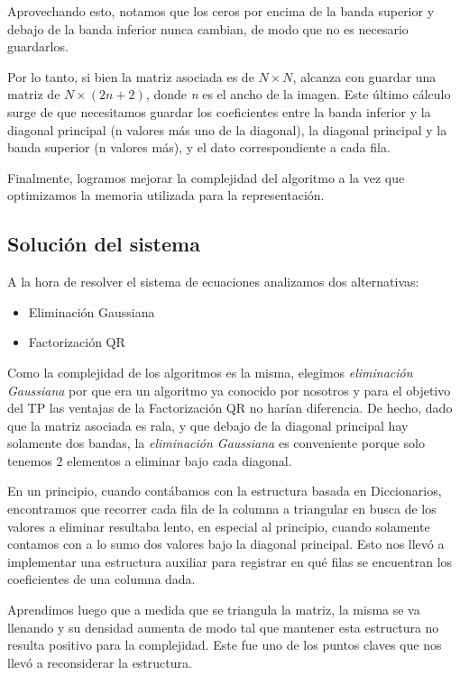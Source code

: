\documentclass[a4paper]{article}
\begin{document}
Aprovechando esto, notamos que los ceros por encima de la banda superior y debajo de la banda inferior nunca cambian, de modo que no es necesario guardarlos. \vspace{1em}

Por lo tanto, si bien la matriz asociada es de $N \times N$, alcanza con guardar una matriz de $N \times (2n + 2)$, donde \textit{n} es el ancho de la imagen. Este último cálculo surge de que necesitamos guardar los coeficientes entre la banda inferior y la diagonal principal (n valores más uno de la diagonal), la diagonal principal y la banda superior (n valores más), y el dato correspondiente a cada fila.

Finalmente, logramos mejorar la complejidad del algoritmo a la vez que optimizamos la memoria utilizada para la representación.

\subsection{Solución del sistema}

A la hora de resolver el sistema de ecuaciones analizamos dos alternativas:
\begin{itemize}
	\item Eliminación Gaussiana
	\item Factorización QR
\end{itemize}

\vspace{2em}
Como la complejidad de los algoritmos es la misma, elegimos \textit{eliminación Gaussiana} por que era un algoritmo ya conocido por nosotros y para el objetivo del TP las ventajas de la Factorización QR no harían diferencia. 
De hecho, dado que la matriz asociada es rala, y que debajo de la diagonal principal hay solamente dos bandas, la \textit{eliminación Gaussiana} es conveniente porque solo tenemos 2 elementos a eliminar bajo cada diagonal.


En un principio, cuando contábamos con la estructura basada en Diccionarios, encontramos que recorrer cada fila de la columna a triangular en busca de los valores a eliminar resultaba lento, en especial al principio, cuando solamente contamos con a lo sumo dos valores bajo la diagonal principal. Esto nos llevó a implementar una estructura auxiliar para registrar en qué filas se encuentran los coeficientes de una columna dada.

Aprendimos luego que a medida que se triangula la matriz, la misma se va llenando y su densidad aumenta de modo tal que mantener esta estructura no resulta positivo para la complejidad. Este fue uno de los puntos claves que nos llevó a reconsiderar la estructura.
\end{document}
